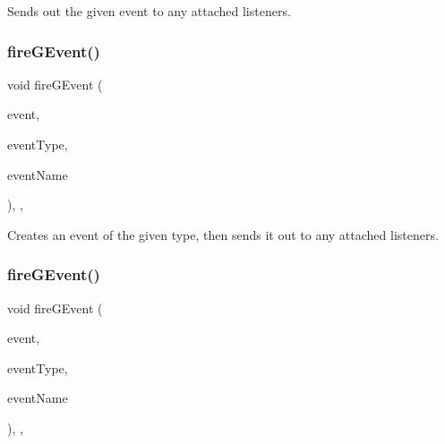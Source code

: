 Sends out the given event to any attached listeners. 

\mbox{\label{classGObservable_ab3983ea07337b52020a29cc00c653d8d}} 
\subsubsection{\texorpdfstring{fire\+G\+Event()}{fireGEvent()}\hspace{0.1cm}{\footnotesize\ttfamily [1/8]}}
{\footnotesize\ttfamily void fire\+G\+Event (\begin{DoxyParamCaption}\item[{Q\+Event $\ast$}]{event,  }\item[{Event\+Type}]{event\+Type,  }\item[{const std\+::string \&}]{event\+Name }\end{DoxyParamCaption})\hspace{0.3cm}{\ttfamily [protected]}, {\ttfamily [virtual]}, {\ttfamily [inherited]}}



Creates an event of the given type, then sends it out to any attached listeners. 

\mbox{\label{classGObservable_a01fdf1b0e0dbd49e189fe4514e010411}} 
\subsubsection{\texorpdfstring{fire\+G\+Event()}{fireGEvent()}\hspace{0.1cm}{\footnotesize\ttfamily [2/8]}}
{\footnotesize\ttfamily void fire\+G\+Event (\begin{DoxyParamCaption}\item[{Q\+Close\+Event $\ast$}]{event,  }\item[{Event\+Type}]{event\+Type,  }\item[{const std\+::string \&}]{event\+Name }\end{DoxyParamCaption})\hspace{0.3cm}{\ttfamily [protected]}, {\ttfamily [virtual]}, {\ttfamily [inherited]}}



